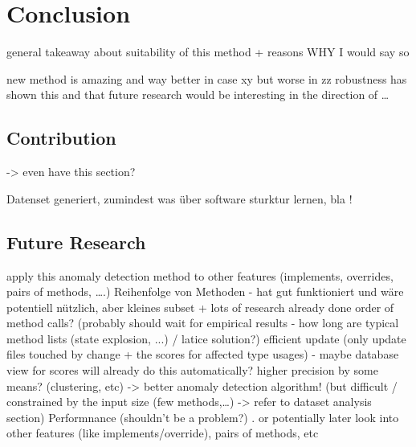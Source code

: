 \chapter{Conclusion}
general takeaway about suitability of this method + reasons WHY I would say so

new method is amazing and way better in case xy but worse in zz
robustness has shown this and that
future research would be interesting in the direction of \ldots

\section{Contribution}
-> even have this section?

Datenset generiert, zumindest was über software sturktur lernen, bla !

\section{Future Research}
apply this anomaly detection method to other features (implements, overrides, pairs of methods, \ldots.)
Reihenfolge von Methoden - hat gut funktioniert und wäre potentiell nützlich, aber kleines subset + lots of research already done
order of method calls? (probably should wait for empirical results - how long are typical method lists (state explosion, ...) / latice solution?)
efficient update (only update files touched by change + the scores for affected type usages) - maybe database view for scores will already do this automatically? 
higher precision by some means? (clustering, etc)
-> better anomaly detection algorithm! (but difficult / constrained by the input size (few methods,\ldots) -> refer to dataset analysis section)
Performnance (shouldn't be a problem?)
.
or potentially later look into other features (like implements/override), pairs of methods, etc
